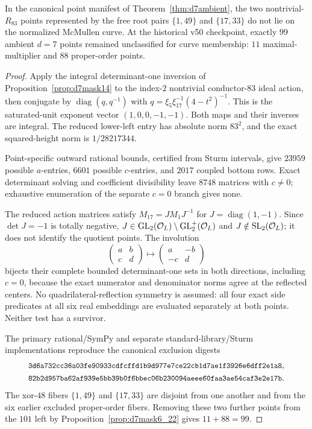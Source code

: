 \begin{proposition}[A fourth pair of proper-order $d=7$ exclusions]\label{prop:d7mask1_17}
In the canonical point manifest of Theorem~\ref{thm:d7ambient}, the
two nontrivial-$R_{83}$ points represented by the free root pairs
$\{1,49\}$ and $\{17,33\}$ do not lie on the normalized McMullen curve.
At the historical v50 checkpoint, exactly $99$ ambient $d=7$ points
remained unclassified for curve membership: $11$ maximal-multiplier and $88$ proper-order points.
\end{proposition}
\begin{proof}
Apply the integral determinant-one inversion of
Proposition~\ref{prop:d7mask14} to the index-$2$ nontrivial conductor-$83$
ideal action, then conjugate by $\operatorname{diag}(q,q^{-1})$ with
$q=\xi_5\xi_{17}^{-1}(4-t^2)^{-1}$. This is the saturated-unit exponent
vector $(1,0,0,-1,-1)$. Both maps and their inverses are integral. The reduced
lower-left entry has absolute norm $83^2$, and the exact squared-height norm is
$1/28217344$.

Point-specific outward rational bounds, certified from Sturm intervals, give
$23959$ possible $a$-entries, $6601$ possible $c$-entries, and $2017$ coupled
bottom rows. Exact determinant solving and coefficient divisibility leave
$8748$ matrices with $c\ne0$; exhaustive enumeration of the separate $c=0$
branch gives none.

The reduced action matrices satisfy $M_{17}=JM_1J^{-1}$ for
$J=\operatorname{diag}(1,-1)$. Since $\det J=-1$ is totally negative,
$J\in\operatorname{GL}_2(\mathcal O_L)\setminus\operatorname{GL}_2^+(\mathcal O_L)$ and $J\notin\operatorname{SL}_2(\mathcal O_L)$; it does not
identify the quotient points. The involution
\[
 \begin{pmatrix}a&b\\c&d\end{pmatrix}
 \longmapsto
 \begin{pmatrix}a&-b\\-c&d\end{pmatrix}
\]
bijects their complete bounded determinant-one sets in both directions,
including $c=0$, because the exact numerator and denominator norms agree at
the reflected centers. No quadrilateral-reflection symmetry is assumed: all
four exact side predicates at all six real embeddings are evaluated separately
at both points. Neither test has a survivor.

The primary rational/SymPy and separate standard-library/Sturm implementations
reproduce the canonical exclusion digests
\[
\begin{gathered}
\digest{3d6a732cc36a03fe90933cdfcffd1b9d}{977e7ce22cb1d7ae1f3926e6dff2e1a8},\\
\digest{82b2d957ba62af939e5bb39b0f6bbec0}{6b230094aeee60faa3ae54caf3e2e17b}.
\end{gathered}
\]
The xor-$48$ fibers $\{1,49\}$ and $\{17,33\}$ are disjoint from one another
and from the six earlier excluded proper-order fibers. Removing these two
further points from the $101$ left by Proposition~\ref{prop:d7mask6_22}
gives $11+88=99$.
\end{proof}


